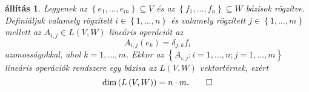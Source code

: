 \documentclass[9pt, a4paper, showtrims]{memoir}
\theoremstyle{plain}
\newtheorem{proposition}{állítás}[chapter]
\theoremstyle{remark}
\theoremstyle{definition}
\begin{document}
\begin{proposition}
	Legyenek az $\left\{ e_1,\ldots,e_m \right\}\subseteq V$ és az
	$\left\{ f_1,\ldots,f_n \right\}\subseteq W$ bázisok rögzítve.
	Definiáljuk valamely rögzített $i\in\left\{ 1,\ldots,n \right\}$ és valamely rögzített
	$j\in \left\{ 1,\ldots,m \right\}$ mellett az $A_{i,j}\in L\left( V,W \right)$ lineáris operációt az
	\begin{equation}
		A_{i,j}\left( e_k \right)=\delta_{j,k}f_i
		\label{eq:aij}
	\end{equation}
	azonosságokkal, ahol $k=1,\ldots,m$.
	Ekkor az $\left\{ A_{i,j}: i=1,\ldots,n;j=1,\ldots,m \right\}$
	lineáris operációk rendszere egy bázisa az $L\left( V,W \right)$ vektortérnek,
	ezért
	\[
		\dim \left( L\left( V,W \right) \right)=n\cdot m.\qedhere
	\]
\end{proposition}
\end{document}
